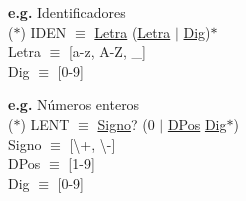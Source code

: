 \documentclass[\main/Apuntes_PL.tex]{subfiles}
\begin{document}
      \bigskip
      \par \noindent
      \textbf{e.g.} Identificadores\\
      \hspace{5mm}($\ast$) IDEN $\equiv$ \underline{Letra} (\underline{Letra} $\mid$ \underline{Dig})$\ast$ \\
      \hspace{10mm} Letra $\equiv$ [a-z, A-Z, \_] \\
      \hspace{10mm} Dig $\equiv$ [0-9]

      \bigskip
      \par \noindent
      \textbf{e.g.} Números enteros\\
      \hspace{5mm}($\ast$) LENT $\equiv$ \underline{Signo}? (0 $\mid$ \underline{DPos} \underline{Dig}$\ast$) \\
      \hspace{10mm} Signo $\equiv$ [\textbackslash+, \textbackslash-] \\
      \hspace{10mm} DPos  $\equiv$ [1-9] \\
      \hspace{10mm} Dig   $\equiv$ [0-9]
\end{document}
